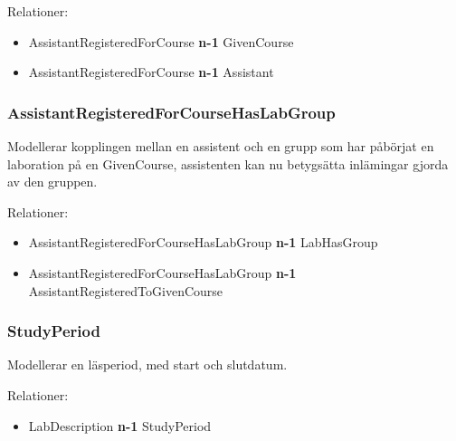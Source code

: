Relationer: 
\begin{itemize}
  \item AssistantRegisteredForCourse {\bf n-1} GivenCourse 
  \item AssistantRegisteredForCourse {\bf n-1} Assistant 
\end{itemize}

\subsubsection{AssistantRegisteredForCourseHasLabGroup}
Modellerar kopplingen mellan en assistent och en grupp som har påbörjat en laboration på en GivenCourse, assistenten kan nu betygsätta inlämingar gjorda av den gruppen. 

Relationer: 
\begin{itemize}
  \item AssistantRegisteredForCourseHasLabGroup {\bf n-1} LabHasGroup 
  \item AssistantRegisteredForCourseHasLabGroup {\bf n-1} AssistantRegisteredToGivenCourse 
\end{itemize}

\subsubsection{StudyPeriod}
Modellerar en läsperiod, med start och slutdatum.

Relationer: 
\begin{itemize}
  \item LabDescription {\bf n-1} StudyPeriod 
\end{itemize}
